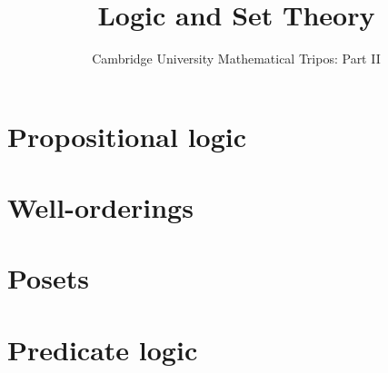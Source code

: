 \documentclass{article}
\title{Logic and Set Theory}
\author{Cambridge University Mathematical Tripos: Part II}
\begin{document}
\maketitle

\tableofcontentsnewpage{}

\section{Propositional logic}

\section{Well-orderings}

\section{Posets}

\section{Predicate logic}

\end{document}
